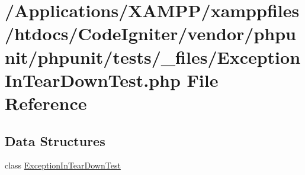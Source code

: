\hypertarget{_exception_in_tear_down_test_8php}{}\section{/\+Applications/\+X\+A\+M\+P\+P/xamppfiles/htdocs/\+Code\+Igniter/vendor/phpunit/phpunit/tests/\+\_\+files/\+Exception\+In\+Tear\+Down\+Test.php File Reference}
\label{_exception_in_tear_down_test_8php}
\subsection*{Data Structures}
\begin{DoxyCompactItemize}
\item 
class \mbox{\hyperlink{class_exception_in_tear_down_test}{Exception\+In\+Tear\+Down\+Test}}
\end{DoxyCompactItemize}
